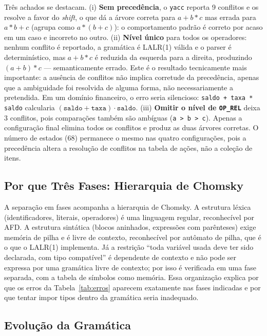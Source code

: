 \documentclass[conference]{IEEEtran}
\begin{document}
Três achados se destacam. (i) \textbf{Sem precedência}, o \texttt{yacc} reporta 9 conflitos e os resolve a favor do \textit{shift}, o que dá a árvore correta para $a+b*c$ mas errada para $a*b+c$ (agrupa como $a*(b+c)$): o comportamento padrão é correto por acaso em um caso e incorreto no outro. (ii) \textbf{Nível único} para todos os operadores: nenhum conflito é reportado, a gramática é LALR(1) válida e o parser é determinístico, mas $a+b*c$ é reduzida da esquerda para a direita, produzindo $(a+b)*c$ --- semanticamente errado. Este é o resultado tecnicamente mais importante: a ausência de conflitos não implica corretude da precedência, apenas que a ambiguidade foi resolvida de alguma forma, não necessariamente a pretendida. Em um domínio financeiro, o erro seria silencioso: \texttt{saldo + taxa * saldo} calcularia $(\texttt{saldo}+\texttt{taxa})\cdot\texttt{saldo}$. (iii) \textbf{Omitir o nível de \texttt{OP\_REL}} deixa 3 conflitos, pois comparações também são ambíguas (\texttt{a > b > c}). Apenas a configuração final elimina todos os conflitos e produz as duas árvores corretas. O número de estados (68) permanece o mesmo nas quatro configurações, pois a precedência altera a resolução de conflitos na tabela de ações, não a coleção de itens.

\subsection{Por que Três Fases: Hierarquia de Chomsky}

A separação em fases acompanha a hierarquia de Chomsky. A estrutura léxica (identificadores, literais, operadores) é uma linguagem regular, reconhecível por AFD. A estrutura sintática (blocos aninhados, expressões com parênteses) exige memória de pilha e é livre de contexto, reconhecível por autômato de pilha, que é o que o LALR(1) implementa. Já a restrição ``toda variável usada deve ter sido declarada, com tipo compatível'' é dependente de contexto e não pode ser expressa por uma gramática livre de contexto; por isso é verificada em uma fase separada, com a tabela de símbolos como memória. Essa organização explica por que os erros da Tabela~\ref{tab:erros} aparecem exatamente nas fases indicadas e por que tentar impor tipos dentro da gramática seria inadequado.

\subsection{Evolução da Gramática}
\end{document}
